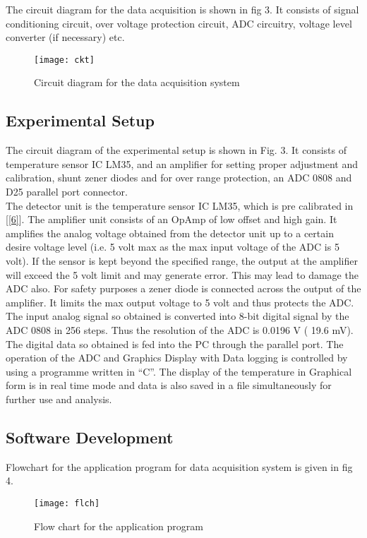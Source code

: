 \documentclass[10pt,a4paper]{article}
\begin{document}
The circuit diagram for the data acquisition is shown in fig 3. It consists of signal conditioning circuit, over voltage protection circuit, ADC circuitry, voltage level converter (if necessary) etc.\\
\begin{figure}[!h]
\centering \texttt{[image: ckt]}
\centering \caption{Circuit diagram for the data acquisition system}
\end{figure}
\subsection{Experimental Setup}
The circuit diagram of the experimental setup is shown in
Fig. 3. It consists of temperature sensor IC LM35, and an amplifier for setting proper adjustment and calibration, shunt zener diodes  and  for over range protection, an ADC 0808 and D25 parallel port connector.\\

The detector unit is the temperature sensor IC LM35, which is pre calibrated in  [\ref{6}]. The amplifier unit consists of an OpAmp of low offset and high gain. It amplifies the analog voltage obtained from the detector unit up to a certain desire voltage level (i.e. 5 volt max as the max input voltage of the ADC is 5 volt). If the sensor is kept beyond the specified range, the output at the amplifier will exceed the 5 volt limit and may generate error. This may lead to damage the ADC also. For safety purposes a zener diode is connected across the output of the amplifier. It limits the max output voltage to 5 volt and thus protects the ADC.\\

The input analog signal so obtained is converted into 8-bit digital signal by the ADC 0808 in 256 steps. Thus the resolution of the ADC is 0.0196 V ( 19.6 mV). The digital data so obtained is fed into the PC through the parallel port. The operation of the ADC and Graphics Display with Data logging is controlled by using a programme written in ``C''. The display of the temperature in Graphical form is in real time mode and data is also saved in a file simultaneously for further use and analysis.\\
\subsection{Software Development}
Flowchart for the application program for data acquisition system is given in fig 4.
\begin{figure}[!h]
\centering \texttt{[image: flch]}
\caption{Flow chart for the application  program}
\end{figure}
\end{document}
